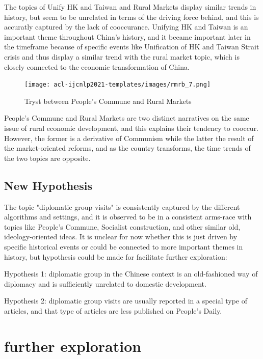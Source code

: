 \documentclass{article}
\begin{document}
The topics of Unify HK and Taiwan and Rural Markets display similar trends in history, but seem to be unrelated in terms of the driving force behind, and this is accuratly captured by the lack of cooccurance. Unifying HK and Taiwan is an important theme throughout China's history, and it became important later in the timeframe because of specific events like Unification of HK and Taiwan Strait crisis and thus display a similar trend with the rural market topic, which is closely connected to the economic transformation of China.

\begin{figure}[h!] 
  \centering
  \texttt{[image: acl-ijcnlp2021-templates/images/rmrb\_7.png]}
  \caption{Tryst between People's Commune and Rural Markets}
  \label{fig:aer-arms}
\end{figure}

People's Commune and Rural Markets are two distinct narratives on the same issue of rural economic development, and this explains their tendency to cooccur. However, the former is a derivative of Communism while the latter the result of the market-oriented reforms, and as the country transforms, the time trends of the two topics are opposite. 


\subsection{New Hypothesis}
The topic "diplomatic group visits" is consistently captured by the different algorithms and settings, and it is observed to be in a consistent arms-race with topics like People's Commune, Socialist construction, and other similar old, ideology-oriented ideas. It is unclear for now whether this is just driven by specific historical events or could be connected to more important themes in history, but hypothesis could be made for facilitate further exploration:

Hypothesis 1: diplomatic group in the Chinese context is an old-fashioned way of diplomacy and is sufficiently unrelated to  domestic development. 

Hypothesis 2: diplomatic group visits are usually reported in a special type of articles, and that type of articles are less published on People's Daily.




\section{further exploration}
\end{document}
